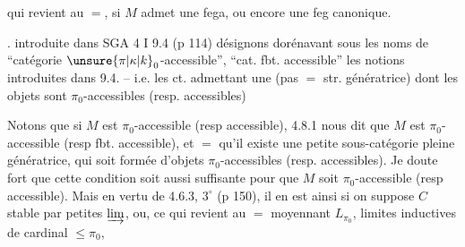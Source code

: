qui revient au $=$,  si $M$ admet une fega, ou encore une feg canonique.


.     introduite dans SGA 4 I 9.4 (p 114)\unsure{);|),|;}   désignons dorénavant sous les noms de ``catégorie  $\unsure{\pi|\kappa|k}_0$-accessible'', ``cat. fbt. accessible'' les notions introduites dans 9.4. -- i.e. les ct. admettant une      (pas $=$ str. génératrice) dont les objets sont $\pi_0$-accessibles (resp. accessibles)

Notons que si $M$ est $\pi_0$-accessible (resp accessible),  4.8.1 nous dit que $M$ est  $\pi_0$-accessible (resp fbt. accessible), et $=$ qu'il existe une petite sous-catégorie pleine  génératrice, qui soit formée d'objets $\pi_0$-accessibles (resp. accessibles). Je doute fort que cette  condition  soit aussi suffisante pour que $M$ soit $\pi_0$-accessible (resp accessible). Mais en vertu de 4.6.3, $3^\circ$ (p 150), il en est ainsi si on suppose $C$ stable par petites $\varinjlim$, ou, ce qui revient au $=$ moyennant $L_{\pi_0}$,   limites inductives de cardinal $\leq\pi_0$,
